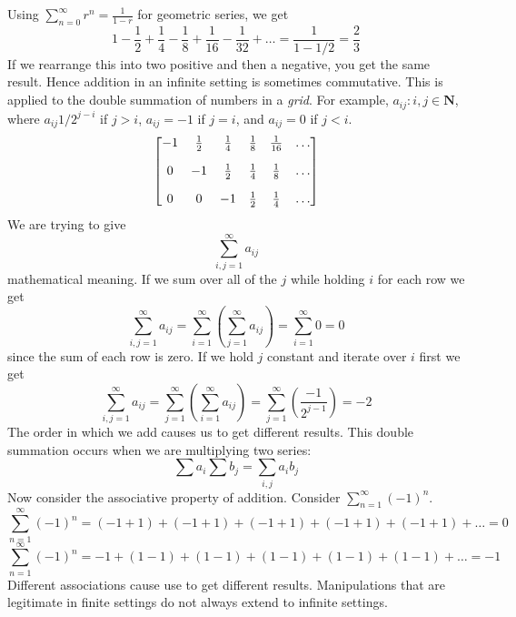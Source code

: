     Using $\sum_{n=0}^\infty r^n = \frac{1}{1 - r}$ for geometric series, we get
    \begin{equation*}
        1 - \frac{1}{2} + \frac{1}{4} - \frac{1}{8} + \frac{1}{16} - \frac{1}{32} + \dots = \frac{1}{1 - 1/2} = \frac{2}{3}
    \end{equation*}
    If we rearrange this into two positive and then a negative, you get the same result. Hence addition in an infinite setting is sometimes commutative.
    \newline \indent
    This is applied to the double summation of numbers in a \textit{grid}. For example, ${a_{ij}: i, j \in \textbf{N}}$, where $a_{ij} 1/2^{j - i}$ if $j > i$, $a_{ij} = -1$ if $j = i$, and $a_{ij} = 0$ if $j < i$.
    $$
        \mqty[
            -1 & \frac{1}{2} & \frac{1}{4} & \frac{1}{8} & \frac{1}{16} & \dots \\[10pt]
            0 & -1 & \frac{1}{2} & \frac{1}{4} & \frac{1}{8} & \dots \\[10pt]
            0 & 0 & -1 & \frac{1}{2} & \frac{1}{4} & \dots
        ]
    $$
    We are trying to give
    \begin{equation*}
        \sum_{i,j=1}^\infty a_{ij}
    \end{equation*}
    mathematical meaning. If we sum over all of the $j$ while holding $i$ for each row we get
    \begin{equation*}
        \sum_{i,j=1}^\infty a_{ij} = \sum_{i=1}^\infty(\sum_{j=1}^\infty a_{ij}) = \sum_{i=1}^\infty 0 = 0
    \end{equation*}
    since the sum of each row is zero. If we hold $j$ constant and iterate over $i$ first we get
    \begin{equation*}
        \sum_{i,j=1}^\infty a_{ij} = \sum_{j=1}^\infty(\sum_{i=1}^\infty a_{ij}) = \sum_{j=1}^\infty (\frac{-1}{2^{j-1}}) = -2
    \end{equation*}
    The order in which we add causes us to get different results. This double summation occurs when we are multiplying two series:
    \begin{equation*}
        \sum a_i \sum b_j = \sum_{i,j} a_ib_j
    \end{equation*}
    Now consider the associative property of addition. Consider $\sum_{n=1}^\infty (-1)^n$.
    \begin{equation*}
        \sum_{n=1}^\infty (-1)^n = (-1 + 1) + (-1 + 1) + (-1 + 1) + (-1 + 1) + (-1 + 1) + \dots = 0
    \end{equation*}
    \begin{equation*}
        \sum_{n=1}^\infty (-1)^n = -1 +(1 - 1) + (1 - 1) + (1 - 1) + (1 - 1) + (1 - 1) + \dots = -1
    \end{equation*}
    Different associations cause use to get different results. Manipulations that are legitimate in finite settings do not always extend to infinite settings.